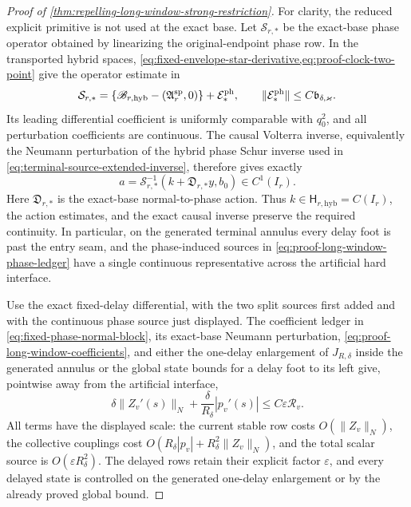 \begin{proof}[Proof of
\cref{thm:repelling-long-window-strong-restriction}]
For clarity, the reduced explicit primitive is not used at the exact base.
Let \(\mathcal S_{r,*}\) be the exact-base phase operator obtained by
linearizing the original-endpoint phase row.  In the transported hybrid
spaces, \cref{eq:fixed-envelope-star-derivative,eq:proof-clock-two-point}
give the operator estimate in
\begin{equation}
 \mathcal S_{r,*}
 =\left\{\mathscr B_{r,\mathrm{hyb}}
       -(\mathfrak A_r^{\rm sp},0)\right\}+\mathcal E_*^{\rm ph},
 \qquad
 \|\mathcal E_*^{\rm ph}\|
       \le C\mathfrak b_{\delta,\varkappa}.       \label{eq:proof-long-window-exact-phase-operator}
\end{equation}
Its leading differential coefficient is uniformly comparable with
\(q_0^2\), and all perturbation coefficients are continuous.  The causal
Volterra inverse, equivalently the Neumann perturbation of the hybrid phase
Schur inverse used in \cref{eq:terminal-source-extended-inverse}, therefore
gives exactly
\begin{equation}
 a=\mathcal S_{r,*}^{-1}
    (k+\mathfrak D_{r,*}y,b_0)\in C^1(I_r).       \label{eq:proof-long-window-exact-phase-inverse}
\end{equation}
Here \(\mathfrak D_{r,*}\) is the exact-base normal-to-phase action.  Thus
\(k\in\mathsf H_{r,\mathrm{hyb}}=C(I_r)\), the action estimates, and the
exact causal inverse preserve the required continuity.  In particular, on
the generated terminal annulus every delay foot is past the entry seam, and
the phase-induced sources in
\cref{eq:proof-long-window-phase-ledger} have a single continuous
representative across the artificial hard interface.

Use the exact fixed-delay differential, with the two split sources first
added and with the continuous phase source just displayed.  The coefficient
ledger in
\cref{eq:fixed-phase-normal-block}, its exact-base Neumann perturbation,
\cref{eq:proof-long-window-coefficients}, and either the one-delay
enlargement of \(J_{R,\delta}\) inside the generated annulus or the global
state bounds for a delay foot to its left give, pointwise away from the
artificial interface,
\begin{equation}
 \delta\|Z_v'(s)\|_N
 +\frac\delta{R_\delta}|p_v'(s)|
 \le C\varepsilon\mathcal R_v.                  \label{eq:proof-long-window-derivative-bound}
\end{equation}
All terms have the displayed scale: the current stable row costs
\(O(\|Z_v\|_N)\), the collective couplings cost
\(O(R_\delta|p_v|+R_\delta^2\|Z_v\|_N)\), and the total scalar source is
\(O(\varepsilon R_\delta^2)\).  The delayed rows retain their explicit
factor \(\varepsilon\), and every delayed state is controlled on the
generated one-delay enlargement or by the already proved global bound.


\end{proof}

